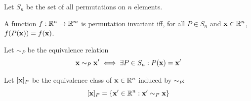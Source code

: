 \begin{appendices}
% 
% 
% 
% 
% 
% 

\begin{definition}
Let $S_n$ be the set of all permutations on $n$ elements.
\end{definition}

\begin{definition}
\label{def:permutation invariance}
A function $f:\mathbb{R}^n \to \mathbb{R}^m$ is permutation invariant iff, for all $P \in S_n$ and $\mathbf{x} \in \mathbb{R}^n$, $f(P(\mathbf{x})) = f(\mathbf{x})$.
\end{definition}

\begin{definition}
Let $\sim_P$ be the equivalence relation
\begin{equation}
    \mathbf{x} \sim_P \mathbf{x}' \iff \exists P \in S_n : P(\mathbf{x}) = \mathbf{x}'
\end{equation}
\end{definition}

\begin{definition}
Let $[\mathbf{x}]_P$ be the equivalence class of $\mathbf{x}\in\mathbb{R}^n$ induced by $\sim_P$:
\begin{equation}
    \label{eq:equivalence class}
    [\mathbf{x}]_P=\{\mathbf{x}' \in \mathbb{R}^n: \mathbf{x}' \sim_P \mathbf{x}\}
\end{equation}
\end{definition}


\end{appendices}
